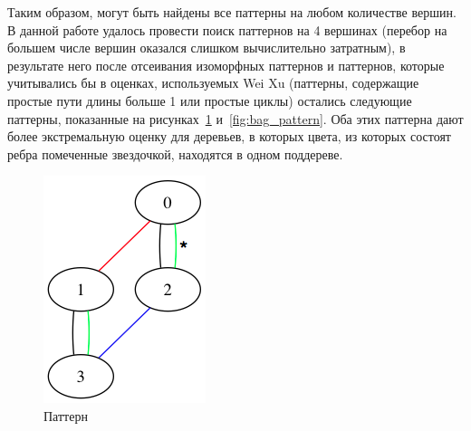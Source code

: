 Таким образом, могут быть найдены все паттерны на любом количестве вершин.
В данной работе удалось провести поиск паттернов на 4 вершинах (перебор на большем числе вершин оказался слишком вычислительно затратным),
в результате него после отсеивания изоморфных паттернов и паттернов, которые учитывались бы в оценках, используемых Wei Xu
(паттерны, содержащие простые пути длины больше 1 или простые циклы) остались следующие паттерны,
показанные на рисунках~\ref{fig:cylinder_pattern} и~\ref{fig:bag_pattern}.
Оба этих паттерна дают более экстремальную оценку для деревьев, в которых цвета,
из которых состоят ребра помеченные звездочкой, находятся в одном поддереве.
\begin{figure}[H]
  \centering
  \includegraphics[max width=\linewidth]{fig/2/patterns/cylinder.png}
    \caption{Паттерн }
    \label{fig:cylinder_pattern}
  \endminipage \hspace{1em}

\end{figure}
